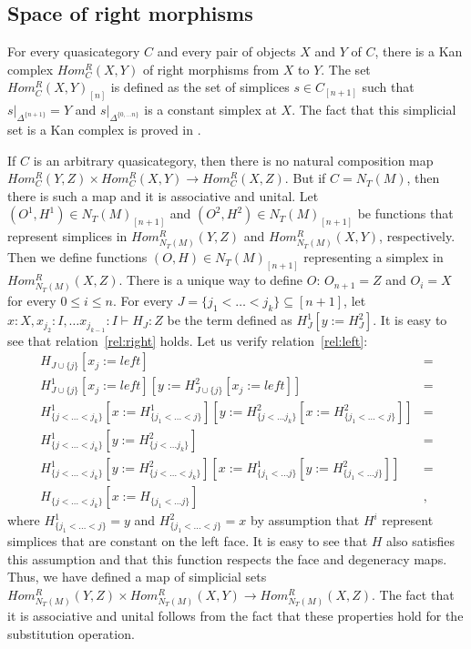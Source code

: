 \documentclass[reqno]{amsart}
\theoremstyle{definition}
\theoremstyle{remark}
\newcommand{\repl}{:=}
\numberwithin{figure}{section}
\begin{document}
\subsection{Space of right morphisms}

For every quasicategory $C$ and every pair of objects $X$ and $Y$ of $C$, there is a Kan complex $Hom^R_C(X,Y)$ of right morphisms from $X$ to $Y$.
The set $Hom^R_C(X,Y)_{[n]}$ is defined as the set of simplices $s \in C_{[n+1]}$ such that $s|_{\Delta^{\{n+1\}}} = Y$ and $s|_{\Delta^{\{0, \ldots n\}}}$ is a constant simplex at $X$.
The fact that this simplicial set is a Kan complex is proved in \cite[Proposition~1.2.2.3]{lurie-topos}.

If $C$ is an arbitrary quasicategory, then there is no natural composition map $Hom^R_C(Y,Z) \times Hom^R_C(X,Y) \to Hom^R_C(X,Z)$.
But if $C = N_T(M)$, then there is such a map and it is associative and unital.
Let $(O^1,H^1) \in N_T(M)_{[n+1]}$ and $(O^2,H^2) \in N_T(M)_{[n+1]}$ be functions that represent simplices in $Hom^R_{N_T(M)}(Y,Z)$ and $Hom^R_{N_T(M)}(X,Y)$, respectively.
Then we define functions $(O,H) \in N_T(M)_{[n+1]}$ representing a simplex in $Hom^R_{N_T(M)}(X,Z)$.
There is a unique way to define $O$: $O_{n+1} = Z$ and $O_i = X$ for every $0 \leq i \leq n$.
For every $J = \{ j_1 < \ldots < j_k \} \subseteq [n+1]$, let $x : X, x_{j_2} : I, \ldots x_{j_{k-1}} : I \vdash H_J : Z$ be the term defined as $H^1_J[y \repl H^2_J]$.
It is easy to see that relation~\eqref{rel:right} holds.
Let us verify relation~\eqref{rel:left}:
\begin{align*}
H_{J \cup \{j\}}[x_j \repl left] & = \\
H^1_{J \cup \{j\}}[x_j \repl left][y \repl H^2_{J \cup \{j\}}[x_j \repl left]] & = \\
H^1_{\{j < \ldots < j_k\}}[x \repl H^1_{\{j_1 < \ldots < j\}}][y \repl H^2_{\{j < \ldots j_k\}}[x \repl H^2_{\{j_1 < \ldots < j\}}]] & = \\
H^1_{\{j < \ldots < j_k\}}[y \repl H^2_{\{j < \ldots j_k\}}] & = \\
H^1_{\{j < \ldots < j_k\}}[y \repl H^2_{\{j < \ldots < j_k\}}][x \repl H^1_{\{j_1 < \ldots j\}}[y \repl H^2_{\{j_1 < \ldots j\}}]] & = \\
H_{\{j < \ldots < j_k\}}[x \repl H_{\{j_1 < \ldots j\}}] & ,
\end{align*}
where $H^1_{\{j_1 < \ldots < j\}} = y$ and $H^2_{\{j_1 < \ldots < j\}} = x$ by assumption that $H^i$ represent simplices that are constant on the left face.
It is easy to see that $H$ also satisfies this assumption and that this function respects the face and degeneracy maps.
Thus, we have defined a map of simplicial sets $Hom^R_{N_T(M)}(Y,Z) \times Hom^R_{N_T(M)}(X,Y) \to Hom^R_{N_T(M)}(X,Z)$.
The fact that it is associative and unital follows from the fact that these properties hold for the substitution operation.
\end{document}
